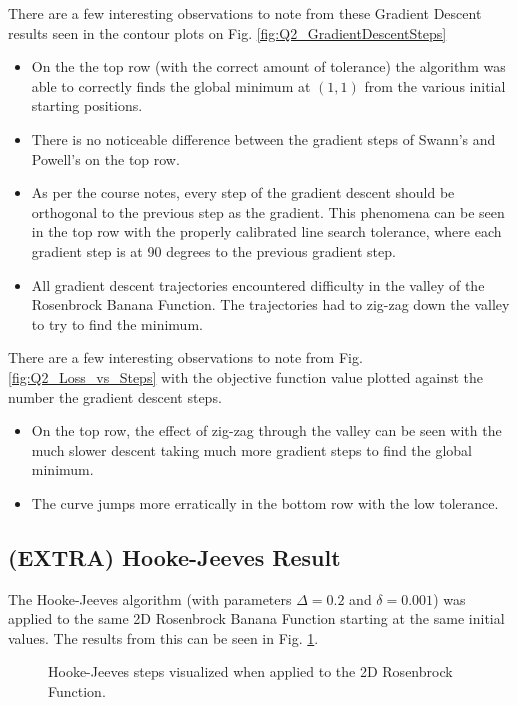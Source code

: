 \documentclass{article}
\begin{document}
    There are a few interesting observations to note from these Gradient Descent results seen in the contour plots on Fig. \ref{fig:Q2_GradientDescentSteps}
    \begin{itemize}
        \item On the the top row (with the correct amount of tolerance) the algorithm was able to correctly finds the global minimum at $(1,1)$ from the various initial starting positions.
        \item There is no noticeable difference between the gradient steps of Swann's and Powell's on the top row.
        \item As per the course notes, every step of the gradient descent should be orthogonal to the previous step as the gradient. This phenomena can be seen in the top row with the properly calibrated line search tolerance, where each gradient step is at 90 degrees to the previous gradient step.
        \item All gradient descent trajectories encountered difficulty in the valley of the Rosenbrock Banana Function. The trajectories had to zig-zag down the valley to try to find the minimum.
    \end{itemize}

    There are a few interesting observations to note from Fig. \ref{fig:Q2_Loss_vs_Steps} with the objective function value plotted against the number the gradient descent steps.
    \begin{itemize}
        \item On the top row, the effect of zig-zag through the valley can be seen with the much slower descent taking much more gradient steps to find the global minimum.
        \item The curve jumps more erratically in the bottom row with the low tolerance.
    \end{itemize}

    \subsection{(EXTRA) Hooke-Jeeves Result}

    The Hooke-Jeeves algorithm (with parameters $\Delta = 0.2$ and $\delta = 0.001$) was applied to the same 2D Rosenbrock Banana Function starting at the same initial values. The results from this can be seen in Fig. \ref{fig:Q2_HJ_visualized}.

    \begin{figure}[H]
        \centering
        
        \caption{Hooke-Jeeves steps visualized when applied to the 2D Rosenbrock Function.}
        \label{fig:Q2_HJ_visualized}
    \end{figure}
\end{document}
